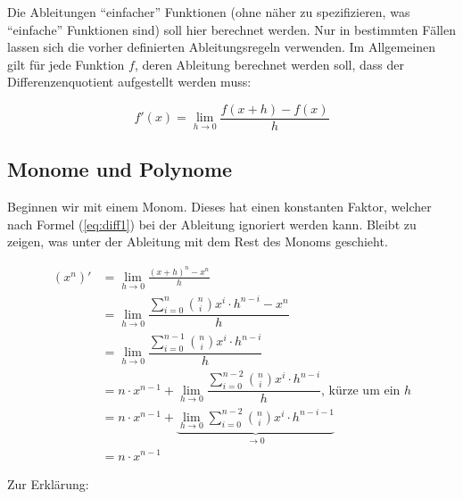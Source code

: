 Die Ableitungen "`einfacher"' Funktionen (ohne näher zu spezifizieren, was "`einfache"' Funktionen sind)  soll hier berechnet werden. Nur in bestimmten Fällen lassen sich die vorher definierten Ableitungsregeln verwenden. Im Allgemeinen gilt für jede Funktion $f$, deren Ableitung berechnet werden soll, dass der Differenzenquotient aufgestellt werden muss:

\begin{equation}
f'(x) = \lim\limits_{h\rightarrow 0} \frac{f(x+h) - f(x)}{h}
\end{equation}

\subsection{Monome und Polynome}

Beginnen wir mit einem Monom. Dieses hat einen konstanten Faktor, welcher nach Formel (\ref{eq:diff1}) bei der Ableitung ignoriert werden kann. Bleibt zu zeigen, was unter der Ableitung mit dem Rest des Monoms geschieht. 

\begin{equation}
\begin{split}
(x^n)' &= \lim_{h\rightarrow 0} \frac{(x+h)^n - x^n}{h} \\
&= \lim_{h\rightarrow 0} \dfrac{\sum_{i=0}^{n}\binom{n}{i} x^i \cdot h^{n-i} - x^n}{h}\\
&= \lim_{h\rightarrow 0} \dfrac{\sum_{i=0}^{n-1}\binom{n}{i} x^i \cdot h^{n-i}}{h}\\
&= n\cdot x^{n-1} + \lim_{h\rightarrow 0} \dfrac{\sum_{i=0}^{n-2}\binom{n}{i} x^i \cdot h^{n-i}}{h} \text{, kürze um ein $h$} \\
&= n\cdot x^{n-1} + \underbrace{\lim_{h\rightarrow 0} \sum_{i=0}^{n-2}\binom{n}{i} x^i \cdot h^{n-i-1}}_{\rightarrow 0}\\
&= n\cdot x^{n-1}
\end{split}
\end{equation}

\noindent Zur Erklärung:

